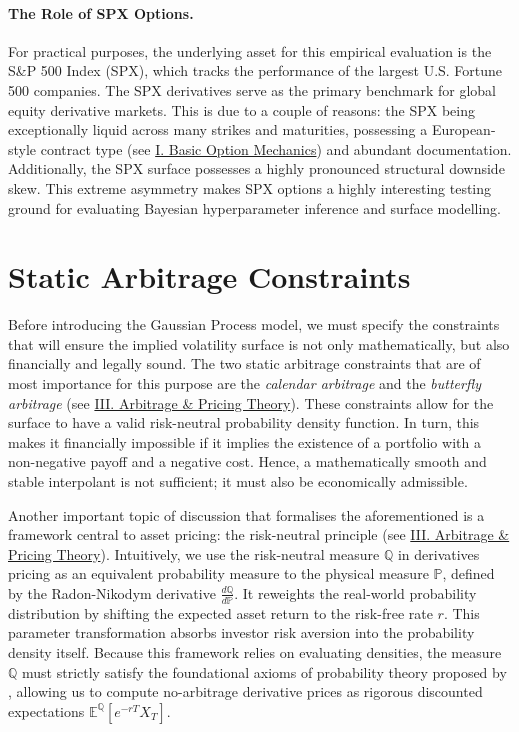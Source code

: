 \documentclass[12pt,oneside]{report}
\theoremstyle{definition}
\theoremstyle{remark}
\begin{document}
\paragraph{The Role of SPX Options.}
For practical purposes, the underlying asset for this empirical evaluation is the S\&P 500 Index (SPX), which tracks the performance of the largest U.S. Fortune 500 companies. The SPX derivatives serve as the primary benchmark for global equity derivative markets. This is due to a couple of reasons: the SPX being exceptionally liquid across many strikes and maturities, possessing a European-style contract type (see \hyperref[sec:glossary_basic_option_definitions]{I. Basic Option Mechanics}) and abundant documentation. Additionally, the SPX surface possesses a highly pronounced structural downside skew. This extreme asymmetry makes SPX options a highly interesting testing ground for evaluating Bayesian hyperparameter inference and surface modelling.

\section{Static Arbitrage Constraints}
\label{subsec:static-arbitrage}
Before introducing the Gaussian Process model, we must specify the constraints that will ensure the implied volatility surface is not only mathematically, but also financially and legally sound. The two static arbitrage constraints that are of most importance for this purpose are the \emph{calendar arbitrage} and the \emph{butterfly arbitrage} (see \hyperref[sec:glossary_arbitrage_pricing_theory]{III. Arbitrage \& Pricing Theory}). These constraints allow for the surface to have a valid risk-neutral probability density function. In turn, this makes it financially impossible if it implies the existence of a portfolio with a non-negative payoff and a negative cost. Hence, a mathematically smooth and stable interpolant is not sufficient; it must also be economically admissible.

Another important topic of discussion that formalises the aforementioned is a framework central to asset pricing: the risk-neutral principle (see \hyperref[sec:glossary_arbitrage_pricing_theory]{III. Arbitrage \& Pricing Theory}). Intuitively, we use the risk-neutral measure $\mathbb{Q}$ in derivatives pricing as an equivalent probability measure to the physical measure $\mathbb{P}$, defined by the Radon-Nikodym derivative $\frac{d\mathbb{Q}}{d\mathbb{P}}$. It reweights the real-world probability distribution by shifting the expected asset return to the risk-free rate $r$. This parameter transformation absorbs investor risk aversion into the probability density itself. Because this framework relies on evaluating densities, the measure $\mathbb{Q}$ must strictly satisfy the foundational axioms of probability theory proposed by \citet{kolmogorov1933foundations}, allowing us to compute no-arbitrage derivative prices as rigorous discounted expectations $\mathbb{E}^{\mathbb{Q}}[e^{-rT} X_T]$.
\end{document}
